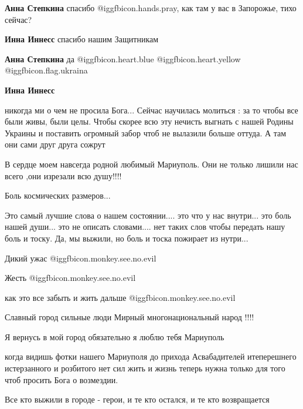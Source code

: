\begin{itemize}
\begin{itemize} %
\textbf{Анна Степкина} спасибо  @igg{fbicon.hands.pray}, как там у вас в Запорожье, тихо сейчас?

\textbf{Инна Иннесс} спасибо нашим Защитникам

\textbf{Анна Степкина} да @igg{fbicon.heart.blue}  @igg{fbicon.heart.yellow} @igg{fbicon.flag.ukraina}

\textbf{Инна Иннесс} 

никогда ми о чем не просила Бога... Сейчас научилась молиться : за то чтобы все
были живы, были целы. Чтобы скорее всю эту нечисть выгнать с нашей Родины
Украины и поставить огромный забор чтоб не вылазили больше оттуда. А там они
сами друг друга сожрут

\end{itemize} %


В сердце моем навсегда родной любимый Мариуполь. Они не только лишили нас всего
,они изрезали всю душу!!!!

Боль космических размеров...


Это самый лучшие слова о нашем состоянии.... это что у нас внутри... это боль
нашей души... это не описать словами.... нет таких слов чтобы передать нашу боль
и тоску. Да, мы выжили, но боль и тоска пожирает из нутри...

Дикий ужас @igg{fbicon.monkey.see.no.evil} 

Жесть @igg{fbicon.monkey.see.no.evil} 

как это все забыть и жить дальше @igg{fbicon.monkey.see.no.evil} 

Славный город сильные люди Мирный многонациональный народ !!!!

Я вернусь в мой город обязательно я люблю тебя Мариуполь


когда видишь фотки нашего Мариуполя до прихода Асвабадителей итеперешнего
истерзанного и розбитого нет сил жить и жизнь теперь нужна только для того чтоб
просить Бога о возмездии.

Все кто выжили в городе - герои, и те кто остался, и те кто возвращается


\end{itemize}
